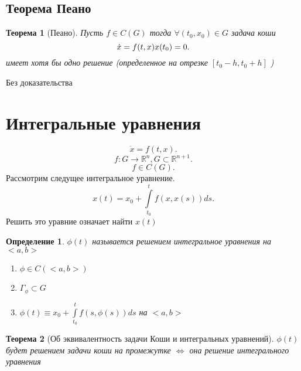 \documentclass[14pt]{extarticle}
\newtheorem{theorem}{Теорема}
\newtheorem{definition}{Определение}
\begin{document}
\subsection{Теорема Пеано}
\begin{theorem}[Пеано]
	Пусть $f \in C(G)$ тогда  $\forall  (t_0,x_0) \in G$ задача коши
	\[
		\dot{x} = f(t,x)\\
		x(t_0) = 0
		.\]
	имеет хотя бы одно решение (определенное на отрезке $[t_0-h,t_0 + h]$ )
\end{theorem}
Без доказательства
\section{Интегральные уравнения}
\[
	\dot{x} = f(t,x)
	.\]
\[
	f : G \to \mathbb{R}^{n}, G \subset \mathbb{R}^{n + 1}
	.\]
\[
	f \in C(G)
	.\]
Рассмотрим следущее интегральное уравнение.
\[
	x(t) = x_0 + \int\limits_{t_0}^{t} f(x,x(s))  ds
	.\]
Решить это уравние означает найти $x(t)$
\begin{definition}
	$\phi(t)$ называется решением интегральное уравнения на  $<a,b>$
	\begin{enumerate}
		\item $\phi \in C(<a,b>)$
		\item $\Gamma_{\phi} \subset G$
		\item $\phi(t) \equiv x_0 + \int\limits_{t_0}^{t} f(s,\phi(s)) ds $ на $<a,b>$
	\end{enumerate}
\end{definition}
\begin{theorem}[Об эквивалентность задачи Коши и интегральных уравнений]
	$\phi(t)$ будет решением задачи коши на промежутке  $\iff$ она решение интегрального уравнения
\end{theorem}
\end{document}
